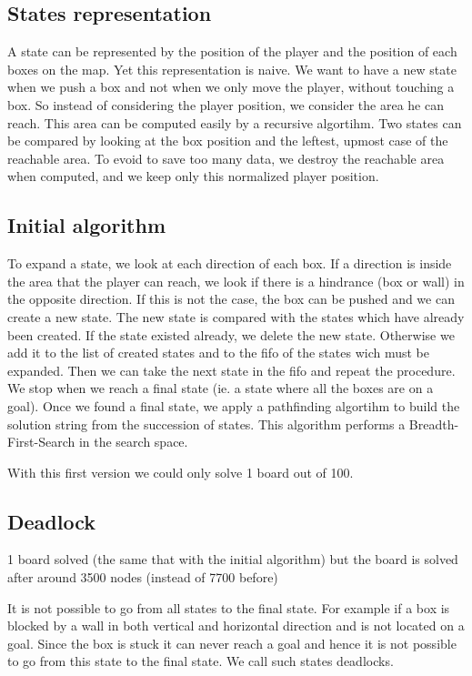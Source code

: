 \documentclass[a4paper,10pt]{article}
\begin{document}
	\subsection{States representation}
	A state can be represented by the position of the player and the position of each boxes on the map. 
	Yet this representation is naive. 
	We want to have a new state when we push a box and not when we only move the player, without touching a box.
	So instead of considering the player position, we consider the area he can reach.
	This area can be computed easily by a recursive algortihm.
	Two states can be compared by looking at the box position and the leftest, upmost case of the reachable area.
	To evoid to save too many data, we destroy the reachable area when computed, and we keep only this normalized player position.
	
	\subsection{Initial algorithm}
	To expand a state, we look at each direction of each box. 
	If a direction is inside the area that the player can reach, we look if there is a hindrance (box or wall) in the opposite direction.
	If this is not the case, the box can be pushed and we can create a new state.
	The new state is compared with the states which have already been created. 
	If the state existed already, we delete the new state.
	Otherwise we add it to the list of created states and to the fifo of the states wich must be expanded.
	Then we can take the next state in the fifo and repeat the procedure.
	We stop when we reach a final state (ie. a state where all the boxes are on a goal).
	Once we found a final state, we apply a pathfinding algortihm to build the solution string from the succession of states.
	This algorithm performs a Breadth-First-Search in the search space.

	With this first version we could only solve 1 board out of 100. 

	\subsection{Deadlock}
	1 board solved (the same that with the initial algorithm) but the board is solved after around 3500 nodes (instead of 7700 before)

	It is not possible to go from all states to the final state.  
	For example if a box is blocked by a wall in both vertical and horizontal direction and is not located on a goal.  
	Since the box is stuck it can never reach a goal and hence it is not possible to go from this state to the final state.    
	We call such states deadlocks.
\end{document}

